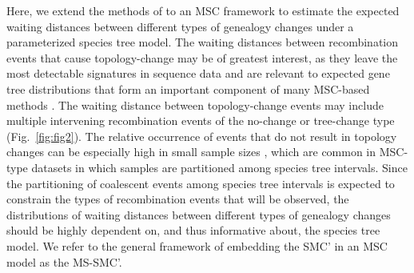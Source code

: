 \documentclass[11pt]{article}
\begin{document}



Here, we extend the methods of \citet{deng_distribution_2021} to an MSC framework
to estimate the expected waiting distances between different types of 
genealogy changes under a parameterized species tree model. 
The waiting distances between recombination events that cause topology-change 
may be of greatest interest, as they leave the most detectable signatures 
in sequence data and are relevant to expected gene tree distributions that form
an important component of many MSC-based methods \citep{
degnan2006discordance, baum_concordance_2007, knowles_estimating_2011}.
The waiting distance between topology-change events may include multiple
intervening recombination events of the no-change or tree-change type
(Fig.~\ref{fig:fig2}). 
The relative occurrence of events that do not result in topology 
changes can be especially high in small sample sizes \citep{wilton2015smc}, 
which are common in MSC-type datasets in which samples are partitioned 
among species tree intervals. 
Since the partitioning of 
coalescent events among species tree intervals is expected to constrain 
the types of recombination events that will be observed, the
distributions of waiting distances between different types of 
genealogy changes should be highly dependent on, and thus informative about, 
the species tree model. We refer to the general framework of embedding the 
SMC' in an MSC model as the MS-SMC'.


\end{document}
